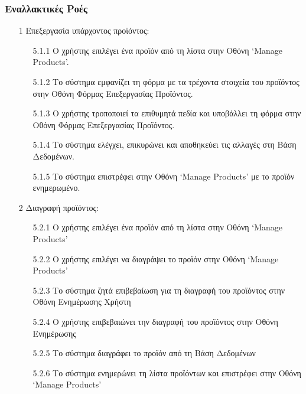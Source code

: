 \documentclass[12pt,a4paper,twoside]{book}
\begin{document}
\subsubsection{Εναλλακτικές Ροές}
\begin{enumerate}
  \item[1 ] Επεξεργασία υπάρχοντος προϊόντος:
        \begin{enumerate}
          \item[5.1.1 ] Ο χρήστης επιλέγει ένα προϊόν από τη λίστα στην Οθόνη `Manage Products'.
          \item[5.1.2 ] Το σύστημα εμφανίζει τη φόρμα με τα τρέχοντα στοιχεία του προϊόντος στην Οθόνη Φόρμας Επεξεργασίας Προϊόντος.
          \item[5.1.3 ] Ο χρήστης τροποποιεί τα επιθυμητά πεδία και υποβάλλει τη φόρμα στην Οθόνη Φόρμας Επεξεργασίας Προϊόντος. %
          \item[5.1.4 ] Το σύστημα ελέγχει, επικυρώνει και αποθηκεύει τις αλλαγές στη Βάση Δεδομένων. %
          \item[5.1.5 ] Το σύστημα επιστρέφει στην Οθόνη `Manage Products' με το προϊόν ενημερωμένο.
        \end{enumerate}
  \item[2 ] Διαγραφή προϊόντος:
        \begin{enumerate}
          \item[5.2.1 ] Ο χρήστης επιλέγει ένα προϊόν από τη λίστα στην Οθόνη `Manage Products'
          \item[5.2.2 ] Ο χρήστης επιλέγει να διαγράψει το προϊόν στην Οθόνη `Manage Products' %
          \item[5.2.3 ] Το σύστημα ζητά επιβεβαίωση για τη διαγραφή του προϊόντος στην Οθόνη Ενημέρωσης Χρήστη%
          \item[5.2.4 ] Ο χρήστης επιβεβαιώνει την διαγραφή του προϊόντος στην Οθόνη Ενημέρωσης %
          \item[5.2.5 ] Το σύστημα διαγράφει το προϊόν από τη Βάση Δεδομένων %
          \item[5.2.6 ] Το σύστημα ενημερώνει τη λίστα προϊόντων και επιστρέφει στην Οθόνη `Manage Products' %
        \end{enumerate}

\end{enumerate}
\end{document}
